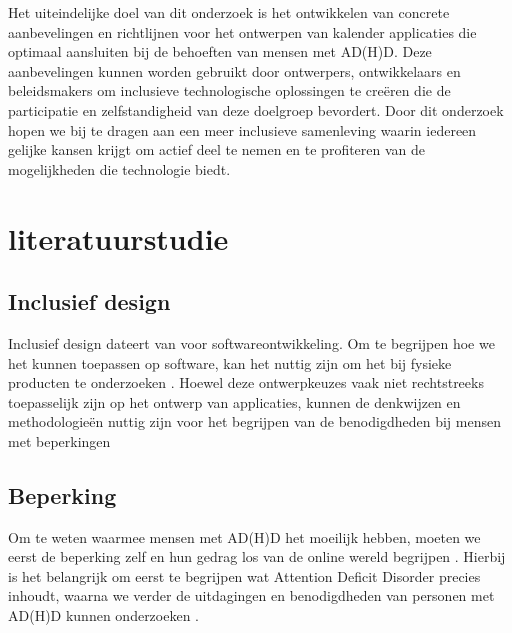 Het uiteindelijke doel van dit onderzoek is het ontwikkelen van concrete aanbevelingen en richtlijnen voor het ontwerpen van kalender applicaties die optimaal aansluiten bij de behoeften van mensen met AD(H)D. Deze aanbevelingen kunnen worden gebruikt door ontwerpers, ontwikkelaars en beleidsmakers om inclusieve technologische oplossingen te creëren die de participatie en zelfstandigheid van deze doelgroep bevordert. \newline \newline
Door dit onderzoek hopen we bij te dragen aan een meer inclusieve samenleving waarin iedereen gelijke kansen krijgt om actief deel te nemen en te profiteren van de mogelijkheden die technologie biedt.



\section{literatuurstudie}%
\label{sec:literatuurstudie}

\subsection{Inclusief design} %
Inclusief design dateert van voor softwareontwikkeling. Om te begrijpen hoe we het kunnen toepassen op software, kan het nuttig zijn om het bij fysieke producten te onderzoeken \autocite{Clarkson2003}. Hoewel deze ontwerpkeuzes vaak niet rechtstreeks toepasselijk zijn op het ontwerp van applicaties, kunnen de denkwijzen en methodologieën nuttig zijn voor het begrijpen van de benodigdheden bij mensen met beperkingen \newline

\subsection{Beperking} %
Om te weten waarmee mensen met AD(H)D het moeilijk hebben, moeten we eerst de beperking zelf en hun gedrag los van de online wereld  begrijpen \autocite{VanHerwegen2019} . Hierbij is het belangrijk om eerst te begrijpen wat Attention Deficit Disorder precies inhoudt, waarna we verder de uitdagingen en benodigdheden van personen met AD(H)D kunnen onderzoeken \autocite{diamond2005attention}.
\newline

